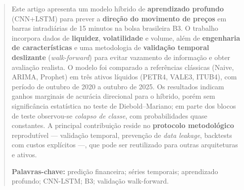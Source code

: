 \begin{abstract}
Este artigo apresenta um modelo híbrido de \textbf{aprendizado profundo} (CNN+LSTM) para prever a \textbf{direção do movimento de preços} em barras intradiárias de 15 minutos na bolsa brasileira B3. O trabalho incorpora dados de \textbf{liquidez}, \textbf{volatilidade} e volume, além de \textbf{engenharia de características} e uma metodologia de \textbf{validação temporal deslizante} (\emph{walk-forward}) para evitar vazamento de informação e obter avaliação realista. O modelo foi comparado a referências clássicas (Naive, ARIMA, Prophet) em três ativos líquidos (PETR4, VALE3, ITUB4), com período de outubro de 2020 a outubro de 2025. Os resultados indicam ganhos marginais de acurácia direcional para o híbrido, porém sem significância estatística no teste de Diebold--Mariano; em parte dos blocos de teste observou-se \emph{colapso de classe}, com probabilidades quase constantes. A principal contribuição reside no \textbf{protocolo metodológico} reprodutível --- validação temporal, prevenção de \emph{data leakage}, backtests com custos explícitos ---, que pode ser reutilizado para outras arquiteturas e ativos.

\vspace{0.5em}
\noindent\textbf{Palavras-chave:} predição financeira; séries temporais; aprendizado profundo; CNN-LSTM; B3; validação walk-forward.
\end{abstract}
